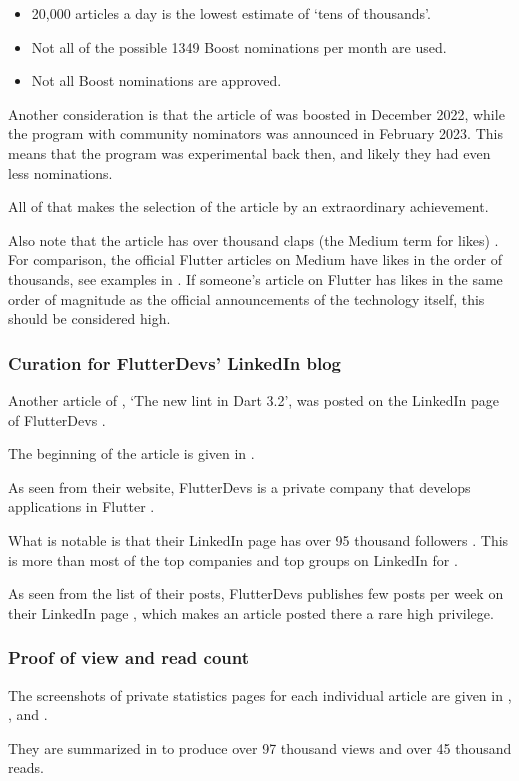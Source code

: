 \begin{itemize}
    \item 20,000 articles a day is the lowest estimate of `tens of thousands'.
    \item Not all of the possible 1349 Boost nominations per month are used.
    \item Not all Boost nominations are approved.
\end{itemize}

Another consideration is that the article of \mrl was boosted in December 2022,
while the program with community nominators was announced in February 2023.
This means that the program was experimental back then, and likely they had even less nominations.

All of that makes the selection of the article by \mrl an extraordinary achievement.

Also note that the article has over thousand claps (the Medium term for likes) .
For comparison, the official Flutter articles on Medium have likes in the order of thousands,
see examples in .
If someone's article on Flutter has likes in the same order of magnitude
as the official announcements of the technology itself, this should be considered high.


\subsubsection{Curation for FlutterDevs' LinkedIn blog}

Another article of \mrl, `The new lint in Dart 3.2',
was posted on the LinkedIn page of FlutterDevs .

The beginning of the article is given in .

As seen from their website, FlutterDevs is a private company
that develops applications in Flutter .

What is notable is that their LinkedIn page has over 95 thousand followers .
This is more than most of the top companies and top groups on LinkedIn for 
.

As seen from the list of their posts,
FlutterDevs publishes few posts per week on their LinkedIn page ,
which makes an article posted there a rare high privilege.


\subsubsection{%
    Proof of view and read count%
}

The screenshots of private statistics pages for each individual article are given in
, , and .

They are summarized in  to produce over 97 thousand views and over 45 thousand reads.

\pagebreak

